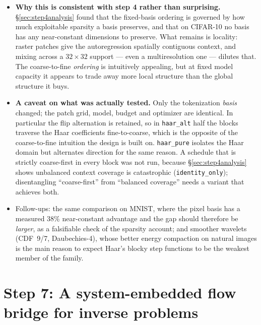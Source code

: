 \documentclass[11pt]{article}
\begin{document}
\begin{itemize}
        are intact but carry pronounced blocky, checkerboard artifacts at the
        patch scale -- the Haar coefficient blocks showing through directly,
        since with every block in the coefficient domain the autoregression
        never gets a pixel-domain pass to smooth across patch boundaries.
  \item \textbf{Why this is consistent with step 4 rather than surprising.}
        \S\ref{sec:step4analysis} found that the fixed-basis ordering is
        governed by how much exploitable sparsity a basis preserves, and that
        on CIFAR-10 no basis has any near-constant dimensions to preserve.
        What remains is locality: raster patches give the autoregression
        spatially contiguous context, and mixing across a $32\times32$
        support --- even a multiresolution one --- dilutes that. The
        coarse-to-fine \emph{ordering} is intuitively appealing, but at fixed
        model capacity it appears to trade away more local structure than the
        global structure it buys.
  \item \textbf{A caveat on what was actually tested.} Only the tokenization
        \emph{basis} changed; the patch grid, model, budget and optimizer are
        identical. In particular the flip alternation is retained, so in
        \texttt{haar\_alt} half the blocks traverse the Haar coefficients
        fine-to-coarse, which is the opposite of the coarse-to-fine intuition
        the design is built on. \texttt{haar\_pure} isolates the Haar domain
        but alternates direction for the same reason. A schedule that is
        strictly coarse-first in every block was not run, because
        \S\ref{sec:step4analysis} shows unbalanced context coverage is
        catastrophic (\texttt{identity\_only}); disentangling ``coarse-first''
        from ``balanced coverage'' needs a variant that achieves both.
  \item Follow-ups: the same comparison on MNIST, where the pixel basis has a
        measured 38\% near-constant advantage and the gap should therefore be
        \emph{larger}, as a falsifiable check of the sparsity account; and
        smoother wavelets (CDF~9/7, Daubechies-4), whose better energy
        compaction on natural images is the main reason to expect Haar's
        blocky step functions to be the weakest member of the family.
\end{itemize}

\section{Step 7: A system-embedded flow bridge for inverse problems}
\end{document}
